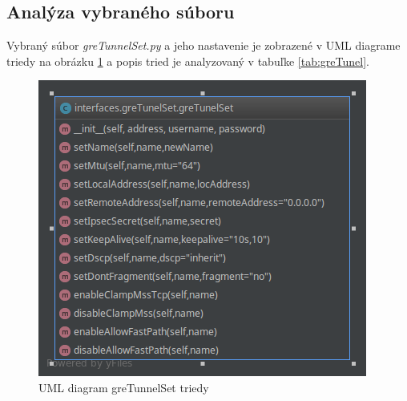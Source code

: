 \subsection{Analýza vybraného súboru}
Vybraný súbor \textit{greTunnelSet.py} a jeho nastavenie je zobrazené v UML diagrame triedy na obrázku \ref{fig:gre} a popis tried je analyzovaný v tabuľke \ref{tab:greTunel}.
\begin{figure}[H]
\centering
\includegraphics[scale=0.45]{../text/gre.png}
\caption{UML diagram greTunnelSet triedy}
\label{fig:gre}
\end{figure}

